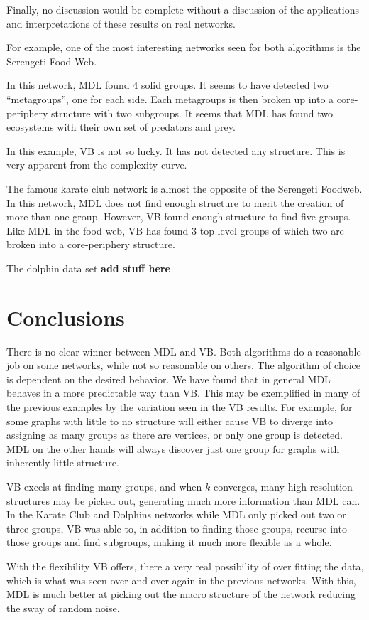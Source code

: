 Finally, no discussion would be complete without a discussion of
the applications and interpretations of these results on real networks.

For example, one of the most interesting networks seen for both algorithms
is the Serengeti Food Web\cite{Baskerville2011}.


In this network, MDL found 4 solid groups. It seems to have detected
two ``metagroups'', one for each side. Each metagroups is then broken up
into a core-periphery structure with two subgroups. It seems that MDL
has found two ecosystems with their own set of predators and prey.

In this example, VB is not so lucky. It has not detected any structure. This
is very apparent from the complexity curve.



The famous karate club network\cite{Zachary1977} is almost the opposite of the Serengeti
Foodweb. In this network, MDL does not find enough structure to merit the
creation of more than one group. However, VB found enough structure to
find five groups. Like MDL in the food web, VB has found 3 top level groups
of which two are broken into a core-periphery structure.

The dolphin data set\cite{Lusseau2003} \textbf{add stuff here}


\section*{Conclusions}

There is no clear winner between MDL and VB. Both algorithms do a reasonable
job on some networks, while not so reasonable on others. The algorithm
of choice is dependent on the desired behavior. We have found that in general
MDL behaves in a more predictable way than VB. This may be exemplified in many of
the previous examples by the variation seen in the VB results. For example, for
some graphs with little to no structure will either cause VB to diverge
into assigning as many groups as there are vertices, or only
one group is detected. MDL on the other hands will always discover just one
group for graphs with inherently little structure.

VB excels at finding many groups, and when $k$ converges, many
high resolution structures may be picked out, generating much more
information than MDL can. In the Karate Club and Dolphins networks
while MDL only picked out two or three groups, VB was able to, in
addition to finding those groups, recurse into those groups and find
subgroups, making it much more flexible as a whole.

With the flexibility VB offers, there a very real possibility of over fitting
the data, which is what was seen over and over again in the previous networks.
With this, MDL is much better at picking out the macro structure of the network
reducing the sway of random noise.



